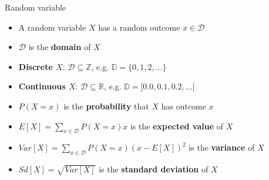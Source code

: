\documentclass{beamer}\usepackage[]{graphicx}\usepackage[]{color}
\makeatletter
\newcommand{\hlopt}[1]{\textcolor[rgb]{0,0,0}{#1}}%
\newcommand{\hlstd}[1]{\textcolor[rgb]{0.345,0.345,0.345}{#1}}%
\newcommand{\hlkwd}[1]{\textcolor[rgb]{0.737,0.353,0.396}{\textbf{#1}}}%
\newenvironment{kframe}{%
 \def\at@end@of@kframe{}%
 \ifinner\ifhmode%
  \def\at@end@of@kframe{\end{minipage}}%
  \begin{minipage}{\columnwidth}%
 \fi\fi%
 \def\FrameCommand##1{\hskip\@totalleftmargin \hskip-\fboxsep
 \colorbox{shadecolor}{##1}\hskip-\fboxsep
     \hskip-\linewidth \hskip-\@totalleftmargin \hskip\columnwidth}%
 \MakeFramed {\advance\hsize-\width
   \@totalleftmargin\z@ \linewidth\hsize
   \@setminipage}}%
 {\par\unskip\endMakeFramed%
 \at@end@of@kframe}
\newenvironment{knitrout}{}{} %
\makeatother
\begin{document}

\begin{frame}{Random variable}
  \begin{itemize}
    \item A random variable $X$ has a random outcome $x \in \mathcal{D}$
    \item $\mathcal{D}$ is the \textbf{domain} of $X$
    \item \textbf{Discrete $X$}: $\mathcal{D} \subseteq \mathbb{Z}$, e.g. $\mathbb{D}=\{0, 1, 2, \dots\}$
    \item \textbf{Continuous $X$}: $\mathcal{D} \subseteq \mathbb{R}$, e.g. $\mathbb{D}=[0.0, 0.1, 0.2, \dots[$
    \item $P(X=x)$ is the \textbf{probability} that $X$ has outcome $x$
    \item $E[X]=\sum_{x \in \mathcal{D}} P(X=x) x$ is the \textbf{expected value} of $X$
    \item $Var[X]=\sum_{x \in \mathcal{D}} P(X=x) (x - E[X])^2$ is the \textbf{variance} of $X$
    \item $Sd[X]=\sqrt{Var[X]}$ is the \textbf{standard deviation} of $X$
  \end{itemize}
\end{frame}
\end{document}
